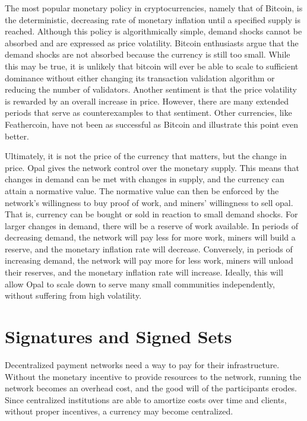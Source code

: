 \documentclass[10pt,twocolumn]{article}
\begin{document}
The most popular monetary policy in cryptocurrencies, namely that of Bitcoin, is the deterministic, decreasing rate of monetary inflation until a specified supply is reached.  Although this policy is algorithmically simple, demand shocks cannot be absorbed and are expressed as price volatility.  Bitcoin enthusiasts argue that the demand shocks are not absorbed because the currency is still too small.  While this may be true, it is unlikely that bitcoin will ever be able to scale to sufficient dominance without either changing its transaction validation algorithm or reducing the number of validators.  Another sentiment is that the price volatility is rewarded by an overall increase in price.  However, there are many extended periods that serve as counterexamples to that sentiment.  Other currencies, like Feathercoin, have not been as successful as Bitcoin and illustrate this point even better.

Ultimately, it is not the price of the currency that matters, but the change in price.  Opal gives the network control over the monetary supply.  This means that changes in demand can be met with changes in supply, and the currency can attain a normative value.  The normative value can then be enforced by the network's willingness to buy proof of work, and miners' willingness to sell opal.  That is, currency can be bought or sold in reaction to small demand shocks.  For larger changes in demand, there will be a reserve of work available.  In periods of decreasing demand, the network will pay less for more work, miners will build a reserve, and the monetary inflation rate will decrease.  Conversely, in periods of increasing demand, the network will pay more for less work, miners will unload their reserves, and the monetary inflation rate will increase.  Ideally, this will allow Opal to scale down to serve many small communities independently, without suffering from high volatility.

\section{Signatures and Signed Sets}
Decentralized payment networks need a way to pay for their infrastructure.  Without the monetary incentive to provide resources to the network, running the network becomes an overhead cost, and the good will of the participants erodes.  Since centralized institutions are able to amortize costs over time and clients, without proper incentives, a currency may become centralized.
\end{document}
